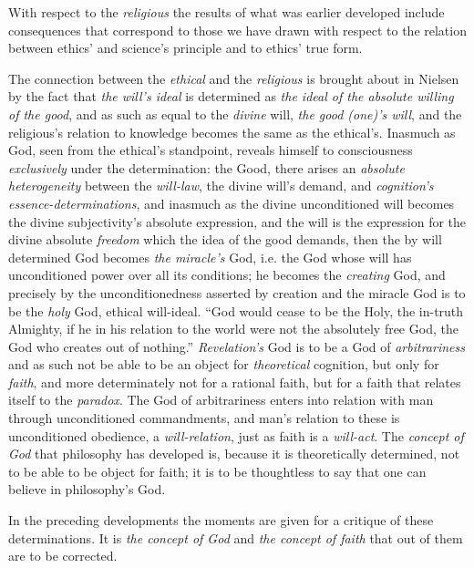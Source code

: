 \documentclass[12pt,a4paper]{book}
\begin{document}
With respect to the \emph{religious} the results of what was earlier developed include consequences that
correspond to those we have drawn with respect to the relation between ethics' and science's principle
and to ethics' true form.

The connection between the \emph{ethical} and the \emph{religious} is brought about in Nielsen by the fact that
\emph{the will's ideal} is determined as \emph{the ideal of the absolute willing of the good}, and as such as
equal to the \emph{divine} will, \emph{the good (one)'s will}, and the religious's relation to knowledge becomes the
same as the ethical's. Inasmuch as God, seen from the ethical's standpoint, reveals himself to
consciousness \emph{exclusively} under the determination: the Good, there arises an \emph{absolute heterogeneity}
between the \emph{will-law}, the divine will's demand, and \emph{cognition's essence-determinations}, and inasmuch as
the divine unconditioned will becomes the divine subjectivity's absolute expression, and the will is the
expression for the divine absolute \emph{freedom} which the idea of the good demands, then the by will determined
God becomes \emph{the miracle's} God, i.e. the God whose will has unconditioned power over all its
conditions; he becomes the \emph{creating} God, and precisely by the unconditionedness asserted by creation
and the miracle God is to be the \emph{holy} God, ethical will-ideal. ``God would cease to be the Holy, the
in-truth Almighty, if he in his relation to the world were not the absolutely free God, the God who creates
out of nothing.'' \emph{Revelation's} God is to be a God of \emph{arbitrariness} and as such not be able to be an
object for \emph{theoretical} cognition, but only for \emph{faith}, and more determinately not for a rational
faith, but for a faith that relates itself to the \emph{paradox}. The God of arbitrariness enters into relation
with man through unconditioned commandments, and man's relation to these is unconditioned obedience, a
\emph{will-relation}, just as faith is a \emph{will-act}. The \emph{concept of God} that philosophy has developed
is, because it is theoretically determined, not to be able to be object for faith; it is to be thoughtless
to say that one can believe in philosophy's God.

In the preceding developments the moments are given for a critique of these determinations. It is \emph{the
concept of God} and \emph{the concept of faith} that out of them are to be corrected.
\end{document}
